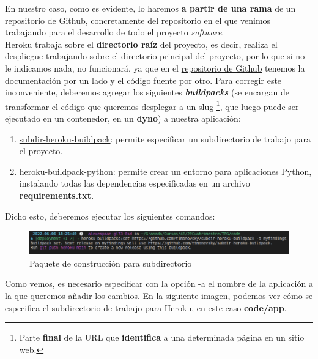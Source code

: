 En nuestro caso, como es evidente, lo haremos \textbf{a partir de una rama} de un
repositorio de Github, concretamente del repositorio en el que venimos trabajando
para el desarrollo de todo el proyecto \textit{software}.\\

Heroku trabaja sobre el \textbf{directorio raíz} del proyecto, es decir, realiza el
despliegue trabajando sobre el directorio principal del proyecto, por lo que si no le
indicamos nada, no funcionará, ya que en el \href{https://github.com/alexespana/TFG}
{repositorio de Github} tenemos la documentación por un lado y el código fuente por
otro. Para corregir este inconveniente, deberemos agregar los siguientes
\textbf{\textit{buildpacks}} (se encargan de transformar el código que queremos desplegar
a un slug \footnote{Parte \textbf{final} de la URL que \textbf{identifica} a una
determinada página en un sitio web.}, que luego puede ser ejecutado en un contenedor, en
un \textbf{dyno}) a nuestra aplicación:

    \begin{enumerate}
        \item \href{https://elements.heroku.com/buildpacks/timanovsky/subdir-heroku-buildpack}
        {subdir-heroku-buildpack}: permite especificar un subdirectorio de trabajo
        para el proyecto.
        \item \href{https://elements.heroku.com/buildpacks/heroku/heroku-buildpack-python}
        {heroku-buildpack-python}: permite crear un entorno para aplicaciones Python,
        instalando todas las dependencias especificadas en un archivo
        \textbf{requirements.txt}.
    \end{enumerate}

Dicho esto, deberemos ejecutar los siguientes comandos:

    \begin{figure}[H]
        \centering
        \includegraphics[scale=0.39]{imagenes/first-buildpack.png}
        \caption{Paquete de construcción para subdirectorio}
        \label{fig:subdir-heroku-buildpack}
    \end{figure}

Como vemos, es necesario especificar con la opción -a el nombre de la aplicación a la que
queremos añadir los cambios. En la siguiente imagen, podemos ver cómo se especifica el
subdirectorio de trabajo para Heroku, en este caso \textbf{code/app}.

